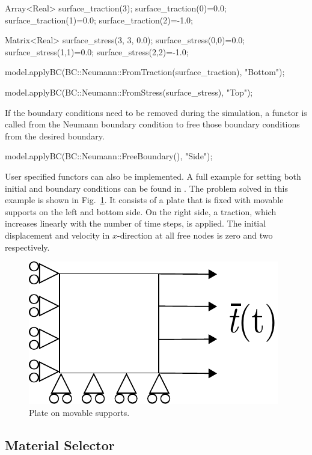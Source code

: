 \begin{cpp}
Array<Real> surface_traction(3);
surface_traction(0)=0.0;
surface_traction(1)=0.0;
surface_traction(2)=-1.0;

Matrix<Real> surface_stress(3, 3, 0.0);
surface_stress(0,0)=0.0;
surface_stress(1,1)=0.0;
surface_stress(2,2)=-1.0;

model.applyBC(BC::Neumann::FromTraction(surface_traction), "Bottom");

model.applyBC(BC::Neumann::FromStress(surface_stress), "Top");
\end{cpp}

If the boundary conditions need to be removed during the simulation, a
functor is called from the Neumann boundary condition to free those
boundary conditions from the desired boundary.

\begin{cpp}
 model.applyBC(BC::Neumann::FreeBoundary(), "Side");
\end{cpp}

User specified functors can also be implemented.  A full example for
setting both initial and boundary conditions can be found in
.  The problem solved
in this example is shown in Fig.~\ref{fig:smm:bc_and_ic}. It consists
of a plate that is fixed with movable supports on the left and bottom
side. On the right side, a traction, which increases linearly with the
number of time steps, is applied. The initial displacement and
velocity in $x$-direction at all free nodes is zero and two
respectively.
\begin{figure}[!htb]
  \centering
  \includegraphics[scale=0.8]{figures/bc_and_ic_example}
  \caption{Plate on movable supports.\label{fig:smm:bc_and_ic}}
\end{figure}

\subsection{Material Selector\label{sect:smm:materialselector}}

